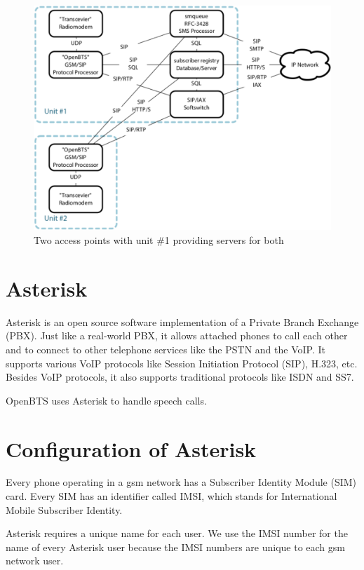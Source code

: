 \begin{figure}
  \centering
    \includegraphics[width=\textwidth]{../images/btsLarge}
  \caption[OpenBTS network with two access points]{Two access points with unit 
  \#1 providing servers for both \protect\cite{openbtsMan}}
  \label{fig:btsLarge}
\end{figure}


\section{Asterisk}
Asterisk is an open source software implementation of a Private Branch
Exchange (PBX). Just like a real-world PBX, it allows attached phones to call
each other and to connect to other telephone services like the PSTN and the 
VoIP. It supports various VoIP protocols like Session Initiation Protocol (SIP),
H.323, etc. Besides VoIP protocols, it also supports traditional protocols 
like ISDN and SS7.

OpenBTS uses Asterisk to handle speech calls.

\section{Configuration of Asterisk}
Every phone operating in a \gls{gsm} network has a Subscriber Identity Module (SIM)
card. Every SIM has an identifier called IMSI, which stands for International
Mobile Subscriber Identity.

Asterisk requires a unique name for each user. We use the IMSI
number for the name of every Asterisk user because the IMSI numbers are unique
to each \gls{gsm} network user.

